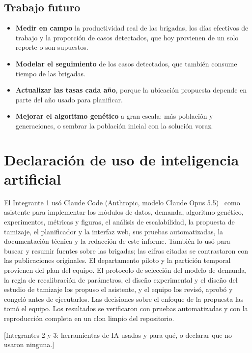\documentclass[11pt,letterpaper]{article}
\newcommand{\pend}[1]{\textcolor{red!70!black}{[#1]}}
\begin{document}
\subsection*{Trabajo futuro}

\begin{itemize}[nosep]
  \item \textbf{Medir en campo} la productividad real de las brigadas, los días efectivos de trabajo y la proporción de casos detectados, que hoy provienen de un solo reporte o son supuestos.
  \item \textbf{Modelar el seguimiento} de los casos detectados, que también consume tiempo de las brigadas.
  \item \textbf{Actualizar las tasas cada año}, porque la ubicación propuesta depende en parte del año usado para planificar.
  \item \textbf{Mejorar el algoritmo genético} a gran escala: más población y generaciones, o sembrar la población inicial con la solución voraz.
\end{itemize}

\section*{Declaración de uso de inteligencia artificial}

El Integrante 1 usó Claude Code (Anthropic, modelo Claude Opus 5.5)~\cite{claudecode} como asistente para implementar los módulos de datos, demanda, algoritmo genético, experimentos, métricas y figuras, el análisis de escalabilidad, la propuesta de tamizaje, el planificador y la interfaz web, sus pruebas automatizadas, la documentación técnica y la redacción de este informe. También lo usó para buscar y resumir fuentes sobre las brigadas; las cifras citadas se contrastaron con las publicaciones originales. El departamento piloto y la partición temporal provienen del plan del equipo. El protocolo de selección del modelo de demanda, la regla de recalibración de parámetros, el diseño experimental y el diseño del estudio de tamizaje los propuso el asistente, y el equipo los revisó, aprobó y congeló antes de ejecutarlos. Las decisiones sobre el enfoque de la propuesta las tomó el equipo. Los resultados se verificaron con pruebas automatizadas y con la reproducción completa en un clon limpio del repositorio.

\pend{Integrantes 2 y 3: herramientas de IA usadas y para qué, o declarar que no usaron ninguna.}
\end{document}
